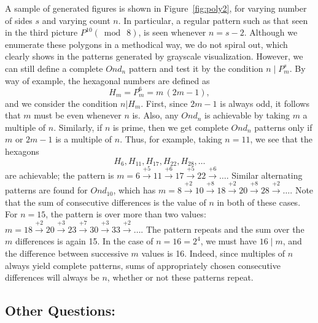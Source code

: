 \documentclass{article}
\theoremstyle{definition}
\def\pmod#1{(\bmod\  #1)}
\begin{document}
A sample of generated figures is shown in Figure~\ref{fig:poly2}, for
varying number of sides $s$ and varying count $n$.  In particular, a
regular pattern such as that seen in the third picture $P^{10}\pmod8$,
is seen whenever $n=s-2$.  Although we enumerate these polygons in a
methodical way, we do not spiral out, which clearly shows in the
patterns generated by grayscale visualization.  However, we can still
define a complete $Ond_n$ pattern and test it by the condition $n\mid
P^s_m$.  By way of example, the hexagonal numbers are defined as
\[
	H_m = P^6_m = m\,(2m - 1),
\]
and we consider the condition $n \vert H_m$.  First, since $2m-1$ is
always odd, it follows that $m$ must be even whenever $n$ is.  Also,
any $Ond_n$ is achievable by taking $m$ a multiple of $n$.  Similarly,
if $n$ is prime, then we get complete $Ond_n$ patterns only if $m$ or
$2m-1$ is a multiple of $n$.  Thus, for example, taking $n=11$, we see
that the hexagons
\[
H_{6}, H_{11}, H_{17}, H_{22}, H_{28}, \ldots
\]
are achievable; the pattern is $m = 6 \xrightarrow{+5} 11
\xrightarrow{+6} 17 \xrightarrow{+5} 22 \xrightarrow{+6} \ldots$.
Similar alternating patterns are found for $Ond_{10}$, which has $m =
8 \xrightarrow{+2} 10 \xrightarrow{+8} 18 \xrightarrow{+2} 20
\xrightarrow{+8} 28 \xrightarrow{+2} \ldots$.  Note that the sum of
consecutive differences is the value of $n$ in both of these cases.
For $n = 15$, the pattern is over more than two values: $m = 18
\xrightarrow{+2} 20 \xrightarrow{+3} 23 \xrightarrow{+7} 30
\xrightarrow{+3} 33 \xrightarrow{+2} \ldots$. The pattern repeats and
the sum over the $m$ differences is again 15.  In the case of $n = 16
= 2^4$, we must have $16\mid m$, and the difference between successive
$m$ values is 16.  Indeed, since multiples of $n$ always yield
complete patterns, sums of appropriately chosen consecutive
differences will always be $n$, whether or not these patterns repeat.

\subsection*{Other Questions:}
\end{document}
